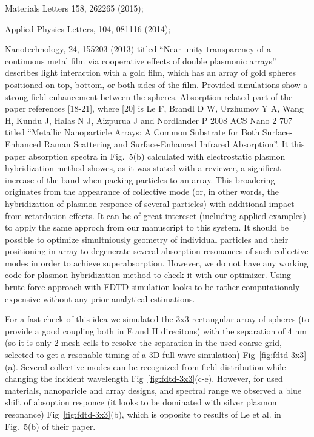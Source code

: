 \documentclass[a4paper]{article}
\begin{document}
Materials Letters 158, 262265 (2015);

Applied Physics Letters, 104, 081116 (2014);

Nanotechnology, 24, 155203 (2013) titled ``Near-unity transparency of
a continuous metal film via cooperative effects of double plasmonic
arrays'' describes light interaction with a gold film, which has an
array of gold spheres positioned on top, bottom, or both sides of the
film.  Provided simulations show a strong field enhancement between
the spheres. Absorption related part of the paper references [18-21],
where [20] is Le F, Brandl D W, Urzhumov Y A, Wang H, Kundu J, Halas N
J, Aizpurua J and Nordlander P 2008 ACS Nano 2 707 titled ``Metallic
Nanoparticle Arrays: A Common Substrate for Both Surface-Enhanced
Raman Scattering and Surface-Enhanced Infrared Absorption''.  It this
paper absorption spectra in Fig.~5(b) calculated with electrostatic
plasmon hybridization method showes, as it was stated with a reviewer,
a significat increase of the band when packing particles to an
array. This broadering originates from the appearance of collective
mode (or, in other words, the hybridization of plasmon responce of
several particles) with additional impact from retardation effects. It
can be of great intereset (including applied examples) to apply the
same approch from our manuscript to this system. It should be possible
to optimize simultniously geometry of individual particles and their
positioning in array to degenerate several absorption resonances of
such collective modes in order to achieve superabsorption. However, we
do not have any working code for plasmon hybridization method to check
it with our optimizer. Using brute force approach with FDTD simulation
looks to be rather computationaly expensive without any prior
analytical estimations.

For a fast check of this idea we simulated the 3x3 rectangular array
of spheres (to provide a good coupling both in E and H direcitons)
with the separation of 4 nm (so it is only 2 mesh cells to resolve the
separation in the used coarse grid, selected to get a resonable timing
of a 3D full-wave simulation) Fig~\ref{fig:fdtd-3x3}(a). Several
collective modes can be recognized from field distribution while
changing the incident wavelength Fig~\ref{fig:fdtd-3x3}(c-e). However,
for used materials, nanoparicle and array designs, and spectral range
we observed a blue shift of absoption responce (it looks to be
dominated with silver plasmon resonance) Fig~\ref{fig:fdtd-3x3}(b),
which is opposite to results of Le et al. in Fig.~5(b) of their paper.
\end{document}
